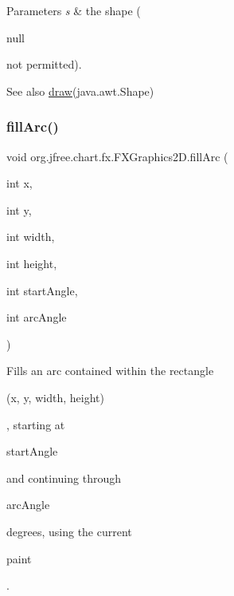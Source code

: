 \begin{DoxyParams}{Parameters}
{\em s} & the shape (
\begin{DoxyCode}
null 
\end{DoxyCode}
 not permitted).\\
\hline
\end{DoxyParams}
\begin{DoxySeeAlso}{See also}
\mbox{\hyperlink{classorg_1_1jfree_1_1chart_1_1fx_1_1_f_x_graphics2_d_a6884b9dbcfe6edf8918466c6f1232236}{draw}}(java.\+awt.\+Shape) 
\end{DoxySeeAlso}
\mbox{\label{classorg_1_1jfree_1_1chart_1_1fx_1_1_f_x_graphics2_d_a1edec17764148609b4b45c919b15c7fc}} 
\subsubsection{\texorpdfstring{fill\+Arc()}{fillArc()}}
{\footnotesize\ttfamily void org.\+jfree.\+chart.\+fx.\+F\+X\+Graphics2\+D.\+fill\+Arc (\begin{DoxyParamCaption}\item[{int}]{x,  }\item[{int}]{y,  }\item[{int}]{width,  }\item[{int}]{height,  }\item[{int}]{start\+Angle,  }\item[{int}]{arc\+Angle }\end{DoxyParamCaption})}

Fills an arc contained within the rectangle 
\begin{DoxyCode}
(x, y, width, height) 
\end{DoxyCode}
 , starting at
\begin{DoxyCode}
startAngle 
\end{DoxyCode}
 and continuing through
\begin{DoxyCode}
arcAngle 
\end{DoxyCode}
 degrees, using the current
\begin{DoxyCode}
paint 
\end{DoxyCode}
 .


